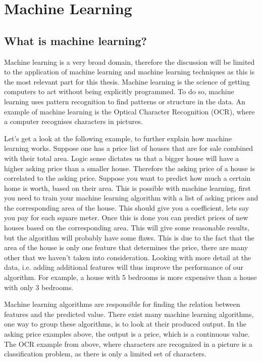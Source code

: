 \chapter{Machine Learning}
{\samenvatting }


\section{What is machine learning?}
Machine learning is a very broad domain, therefore the discussion will be limited to the application of machine learning and machine learning techniques as this is the most relevant part for this thesis. Machine learning is the science of getting computers to act without being explicitly programmed. To do so, machine learning uses pattern recognition to find patterns or structure in the data. An example of machine learning is the Optical Character Recognition (OCR), where a computer recognises characters in pictures.

\npar

Let's get a look at the following example, to further explain how machine learning works. Suppose one has a price list of houses that are for sale combined with their total area. Logic sense dictates us that a bigger house will have a higher asking price than a smaller house. Therefore the asking price of a house is correlated to the asking price. Suppose you want to predict how much a certain home is worth, based on their area. This is possible with machine learning, first you need to train your machine learning algorithm with a list of asking prices and the corresponding area of the house. This should give you a coefficient, lets say you pay  for each square meter. Once this is done you can predict prices of new houses based on the corresponding area. 
\npar
This will give some reasonable results, but the algorithm will probably have some flaws. This is due to the fact that the area of the house is only one feature that determines the price, there are many other that we haven't taken into consideration. Looking with more detail at the data, i.e. adding additional features will thus improve the performance of our algorithm. For example, a house with 5 bedrooms is more expensive than a house with only 3 bedrooms.

\npar

Machine learning algorithms are responsible for finding the relation between features and the predicted value. There exist many machine learning algorithms, one way to group these algorithms, is to look at their produced output. In the asking price examples above, the output is a price, which is a continuous value. The OCR example from above, where characters are recognized in a picture is a classification problem, as there is only a limited set of characters. 

